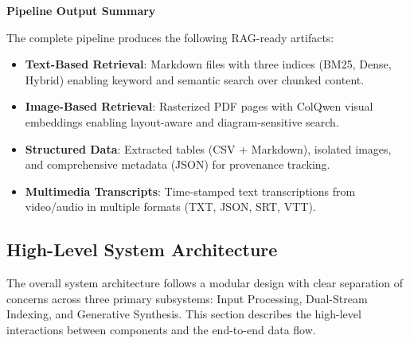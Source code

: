 \begin{table}[H]
\centering
\caption{Visual embedding and indexing pipeline stages.}
\label{tab:visual_indexing}
\end{table}

\textbf{Pipeline Output Summary}

The complete pipeline produces the following RAG-ready artifacts:

\begin{itemize}
    \item \textbf{Text-Based Retrieval}: Markdown files with three indices (BM25, Dense, Hybrid) enabling keyword and semantic search over chunked content.
    \item \textbf{Image-Based Retrieval}: Rasterized PDF pages with ColQwen visual embeddings enabling layout-aware and diagram-sensitive search.
    \item \textbf{Structured Data}: Extracted tables (CSV + Markdown), isolated images, and comprehensive metadata (JSON) for provenance tracking.
    \item \textbf{Multimedia Transcripts}: Time-stamped text transcriptions from video/audio in multiple formats (TXT, JSON, SRT, VTT).
\end{itemize}

\subsection{High-Level System Architecture}

The overall system architecture follows a modular design with clear separation of concerns across three primary subsystems: Input Processing, Dual-Stream Indexing, and Generative Synthesis. This section describes the high-level interactions between components and the end-to-end data flow.

